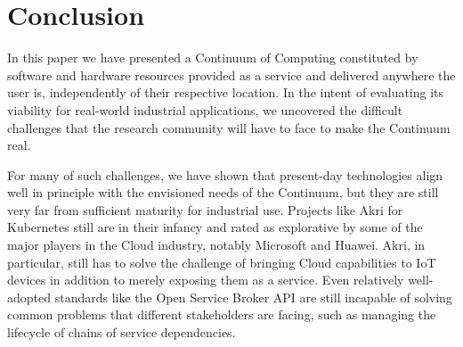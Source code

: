 


\section{Conclusion}
\label{sec:conclusion}

In this paper we have presented a Continuum of Computing constituted by software and hardware resources provided as a service and delivered anywhere the user is, independently of their respective location. 
In the intent of evaluating its viability for real-world industrial applications, we uncovered the difficult challenges that the research community will have to face to make the Continuum real. 

For many of such challenges, we have shown that present-day technologies align well in principle with the envisioned needs of the Continuum, but they are still very far from sufficient maturity for industrial use. Projects like Akri for Kubernetes still are in their infancy and rated as explorative by some of the major players in the Cloud industry, notably Microsoft and Huawei. 
Akri, in particular, still has to solve the challenge of bringing Cloud capabilities to IoT devices in addition to merely exposing them as a service.
Even relatively well-adopted standards like the Open Service Broker API are still incapable of solving common problems that different stakeholders are facing, such as managing the lifecycle of chains of service dependencies.


